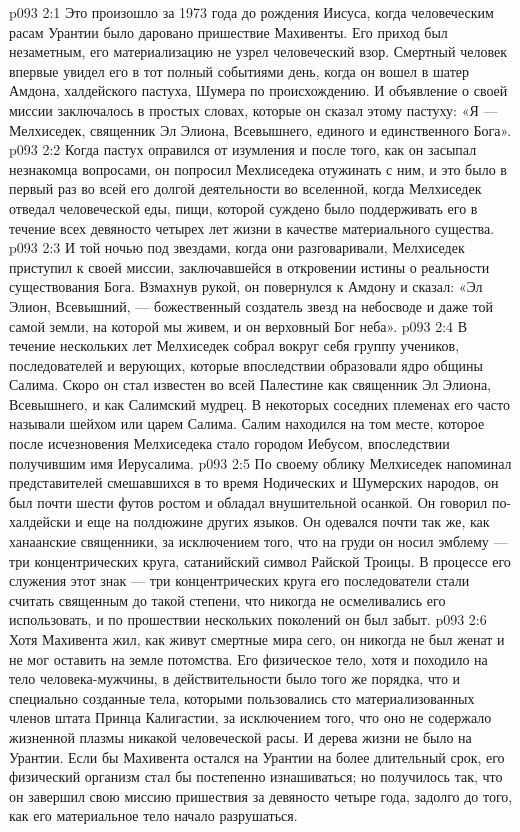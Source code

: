 \vs p093 2:1 Это произошло за 1973 года до рождения Иисуса, когда человеческим расам Урантии было даровано пришествие Махивенты. Его приход был незаметным, его материализацию не узрел человеческий взор. Смертный человек впервые увидел его в тот полный событиями день, когда он вошел в шатер Амдона, халдейского пастуха, Шумера по происхождению. И объявление о своей миссии заключалось в простых словах, которые он сказал этому пастуху: «Я --- Мелхиседек, священник Эл Элиона, Всевышнего, единого и единственного Бога».
\vs p093 2:2 Когда пастух оправился от изумления и после того, как он засыпал незнакомца вопросами, он попросил Мехлиседека отужинать с ним, и это было в первый раз во всей его долгой деятельности во вселенной, когда Мелхиседек отведал человеческой еды, пищи, которой суждено было поддерживать его в течение всех девяносто четырех лет жизни в качестве материального существа.
\vs p093 2:3 И той ночью под звездами, когда они разговаривали, Мелхиседек приступил к своей миссии, заключавшейся в откровении истины о реальности существования Бога. Взмахнув рукой, он повернулся к Амдону и сказал: «Эл Элион, Всевышний, --- божественный создатель звезд на небосводе и даже той самой земли, на которой мы живем, и он верховный Бог неба».
\vs p093 2:4 \pc В течение нескольких лет Мелхиседек собрал вокруг себя группу учеников, последователей и верующих, которые впоследствии образовали ядро общины Салима. Скоро он стал известен во всей Палестине как священник Эл Элиона, Всевышнего, и как Салимский мудрец. В некоторых соседних племенах его часто называли шейхом или царем Салима. Салим находился на том месте, которое после исчезновения Мелхиседека стало городом Иебусом, впоследствии получившим имя Иерусалима.
\vs p093 2:5 \pc По своему облику Мелхиседек напоминал представителей смешавшихся в то время Нодических и Шумерских народов, он был почти шести футов ростом и обладал внушительной осанкой. Он говорил по\hyp{}халдейски и еще на полдюжине других языков. Он одевался почти так же, как ханаанские священники, за исключением того, что на груди он носил эмблему --- три концентрических круга, сатанийский символ Райской Троицы. В процессе его служения этот знак --- три концентрических круга его последователи стали считать священным до такой степени, что никогда не осмеливались его использовать, и по прошествии нескольких поколений он был забыт.
\vs p093 2:6 Хотя Махивента жил, как живут смертные мира сего, он никогда не был женат и не мог оставить на земле потомства. Его физическое тело, хотя и походило на тело человека\hyp{}мужчины, в действительности было того же порядка, что и специально созданные тела, которыми пользовались сто материализованных членов штата Принца Калигастии, за исключением того, что оно не содержало жизненной плазмы никакой человеческой расы. И дерева жизни не было на Урантии. Если бы Махивента остался на Урантии на более длительный срок, его физический организм стал бы постепенно изнашиваться; но получилось так, что он завершил свою миссию пришествия за девяносто четыре года, задолго до того, как его материальное тело начало разрушаться.
